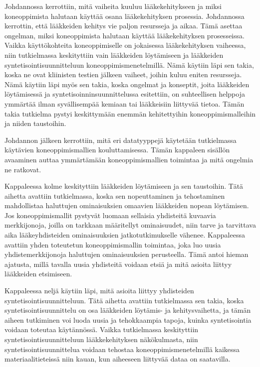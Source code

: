 \documentclass[finnish,twoside,censored,tkt,sw-line]{HYthesisML}
\begin{document}
Johdannossa kerrottiin, mitä vaiheita kuuluu lääkekehitykseen ja miksi koneoppimista halutaan käyttää osana lääkekehityksen prosessia.
Johdannossa kerrottin, että lääkkeiden kehitys vie paljon resursseja ja aikaa.
Tämä asettaa ongelman, miksi koneoppimista halutaan käyttää lääkekehityksen prosesseissa.
Vaikka käyttökohteita koneoppimiselle on jokaisessa lääkekehityksen vaiheessa, niin tutkielmassa keskityttiin vain lääkkeiden löytämiseen ja lääkkeiden syntetisointisuunnitteluun koneoppimismenetelmillä.
Nämä käytiin läpi sen takia, koska ne ovat kliinisten testien jälkeen vaiheet, joihin kuluu eniten resursseja.
Nämä käytiin läpi myös sen takia, koska ongelmat ja konseptit, joita lääkkeiden löytämisessä ja syntetisoinninsuunnittelussa esitettiin, on suhteellisen helppoja ymmärtää ilman syvällisempää kemiaan tai lääkkeisiin liittyvää tietoa.
Tämän takia tutkielma pystyi keskittymään enemmän kehitettyihin koneoppimismalleihin ja niiden taustoihin.

Johdannon jälkeen kerrottiin, mitä eri datatyyppejä käytetään tutkielmassa käytävien koneoppimismallien kouluttamisessa.
Tämän kappaleen sisällön avaaminen auttaa ymmärtämään koneoppimismallien toimintaa ja mitä ongelmia ne ratkovat.

Kappaleessa kolme keskityttiin lääkkeiden löytämiseen ja sen taustoihin.
Tätä aihetta avattiin tutkielmassa, koska sen nopeuttaminen ja tehostaminen mahdollistaa haluttujen ominaisuksien omaavien lääkkeiden nopean löytämisen.
Jos koneoppimismallit pystyvät luomaan sellaisia yhdisteitä kuvaavia merkkijonoja, joilla on tarkkaan määritellyt ominaisuudet, niin tarve ja tarvittava aika lääkeyhdisteiden ominaisuuksien jatkotutkimukselle vähenee.
Kappaleessa avattiin yhden toteutetun koneoppimismallin toimintaa, joka luo uusia yhdistemerkkijonoja haluttujen ominaisuuksien perusteella.
Tämä antoi hieman ajatusta, millä tavalla uusia yhdisteitä voidaan etsiä ja mitä asioita liittyy lääkkeiden etsimiseen.

Kappaleessa neljä käytiin läpi, mitä asioita liittyy yhdisteiden syntetisointisuunnitteluun.
Tätä aihetta avattiin tutkielmassa sen takia, koska syntetisointisuunnittelu on osa lääkkeiden löytämis- ja kehitysvaihetta, ja tämän aiheen tutkiminen voi luoda uusia ja tehokkaampia tapoja, kuinka syntetisointia voidaan toteutaa käytännössä.
Vaikka tutkielmassa keskityttiin syntetisointisuunnitteluun lääkkekehityksen näkökulmasta, niin syntetisointisuunnittelua voidaan tehostaa koneoppimismenetelmillä kaikessa materiaalitieteissä niin kauan, kun aiheeseen liittyvää dataa on saatavilla.
\end{document}
